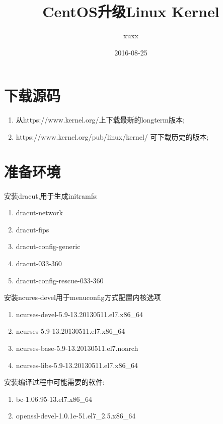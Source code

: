﻿



\title{CentOS升级Linux Kernel}
\author{xuxx}
\date{2016-08-25}
\maketitle

\section{下载源码}
\begin{enumerate}
\item 从https://www.kernel.org/上下载最新的longterm版本;
\item https://www.kernel.org/pub/linux/kernel/ 可下载历史的版本;
\end{enumerate}

\section{准备环境}
安装dracut,用于生成initramfs:
\begin{enumerate}
\item dracut-network
\item dracut-fips
\item dracut-config-generic
\item dracut-033-360
\item dracut-config-rescue-033-360
\end{enumerate}

安装ncures-devel用于menuconfig方式配置内核选项
\begin{enumerate}
\item ncurses-devel-5.9-13.20130511.el7.x86\_64
\item ncurses-5.9-13.20130511.el7.x86\_64
\item ncurses-base-5.9-13.20130511.el7.noarch
\item ncurses-libs-5.9-13.20130511.el7.x86\_64
\end{enumerate}

安装编译过程中可能需要的软件:
\begin{enumerate}
\item bc-1.06.95-13.el7.x86\_64
\item openssl-devel-1.0.1e-51.el7\_2.5.x86\_64
\end{enumerate}

